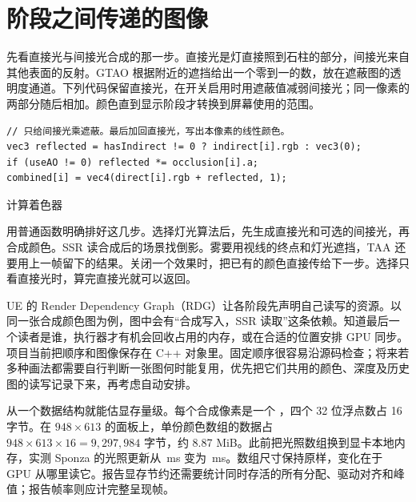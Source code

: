 \clearpage
\section{阶段之间传递的图像}

先看直接光与间接光合成的那一步。直接光是灯直接照到石柱的部分，间接光来自其他表面的反射。GTAO 根据附近的遮挡给出一个零到一的数，放在遮蔽图的透明度通道。下列代码保留直接光，在开关启用时用遮蔽值减弱间接光；同一像素的两部分随后相加。颜色直到显示阶段才转换到屏幕使用的范围。
\begin{lstlisting}
// 只给间接光乘遮蔽。最后加回直接光，写出本像素的线性颜色。
vec3 reflected = hasIndirect != 0 ? indirect[i].rgb : vec3(0);
if (useAO != 0) reflected *= occlusion[i].a;
combined[i] = vec4(direct[i].rgb + reflected, 1);
\end{lstlisting}
{\small{}\quad 计算着色器 }\par

 用普通函数明确排好这几步。选择灯光算法后，先生成直接光和可选的间接光，再合成颜色。SSR 读合成后的场景找倒影。雾要用视线的终点和灯光遮挡，TAA 还要用上一帧留下的结果。关闭一个效果时，把已有的颜色直接传给下一步。选择只看直接光时，算完直接光就可以返回。

UE 的 Render Dependency Graph（RDG）让各阶段先声明自己读写的资源。以同一张合成颜色图为例，图中会有“合成写入，SSR 读取”这条依赖。知道最后一个读者是谁，执行器才有机会回收占用的内存，或在合适的位置安排 GPU 同步。项目当前把顺序和图像保存在 C++ 对象里。固定顺序很容易沿源码检查；将来若多种画法都需要自行判断一张图何时能复用，优先把它们共用的颜色、深度及历史图的读写记录下来，再考虑自动安排。

从一个数据结构就能估显存量级。每个合成像素是一个 ，四个 32 位浮点数占 16 字节。在 $948\times613$ 的面板上，单份颜色数组的数据占 $948\times613\times16=9{,}297{,}984$ 字节，约 8.87 MiB。此前把光照数组换到显卡本地内存，实测 Sponza 的光照更新从 \memoryOld\,ms 变为 \memoryNew\,ms。数组尺寸保持原样，变化在于 GPU 从哪里读它。报告显存节约还需要统计同时存活的所有分配、驱动对齐和峰值；报告帧率则应计完整呈现帧。


